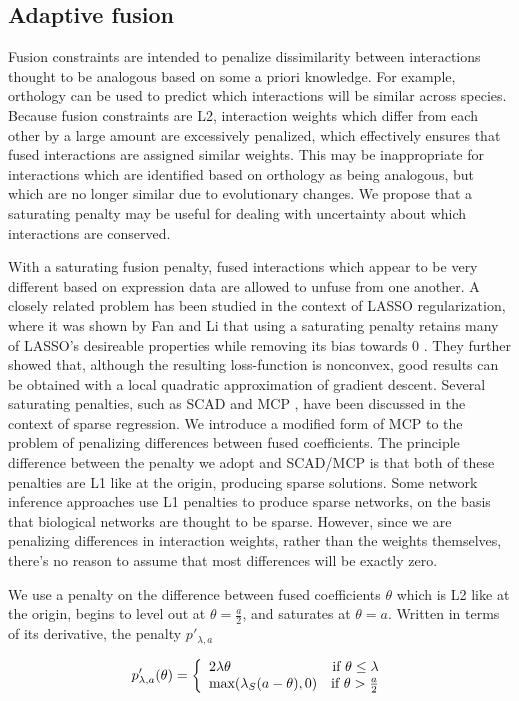 \documentclass[11pt]{article}
\begin{document}
\subsection{Adaptive fusion}
Fusion constraints are intended to penalize dissimilarity between interactions thought to be analogous based on some a priori knowledge. For example, orthology can be used to predict which interactions will be similar across species. Because fusion constraints are L2, interaction weights which differ from each other by a large amount are excessively penalized, which effectively ensures that fused interactions are assigned similar weights. This may be inappropriate for interactions which are identified based on orthology as being analogous, but which are no longer similar due to evolutionary changes. We propose that a saturating penalty may be useful for dealing with uncertainty about which interactions are conserved. 

With a saturating fusion penalty, fused interactions which appear to be very different based on expression data are allowed to unfuse from one another. A closely related problem has been studied in the context of LASSO regularization, where it was shown by Fan and Li that using a saturating penalty retains many of LASSO's desireable properties while removing its bias towards 0 \cite{fan2001variable}. They further showed that, although the resulting loss-function is nonconvex, good results can be obtained with a local quadratic approximation of gradient descent. Several saturating penalties, such as SCAD \cite{fan2001variable} and MCP \cite{zhang2010nearly}, have been discussed in the context of sparse regression. We introduce a modified form of MCP to the problem of penalizing differences between fused coefficients. The principle difference between the penalty we adopt and SCAD/MCP is that both of these penalties are L1 like at the origin, producing sparse solutions. Some network inference approaches use L1 penalties to produce sparse networks, on the basis that biological networks are thought to be sparse. However, since we are penalizing differences in interaction weights, rather than the weights themselves, there's no reason to assume that most differences will be exactly zero. 

We use a penalty on the difference between fused coefficients $\theta$ which is L2 like at the origin, begins to level out at $\theta = \frac{a}{2}$, and saturates at $\theta = a$. Written in terms of its derivative, the penalty $p'_{\lambda, a}$

\begin{equation}
p'_{\lambda,a}(\theta) = \left\{
    \begin{array}{lr}
    2\lambda\theta & \text{if } \theta \leq \lambda\\
    \text{max}(\lambda_S(a-\theta),0) & \text{if } \theta > {a \over 2}
    \end{array}
    \right.
\end{equation}
\end{document}
